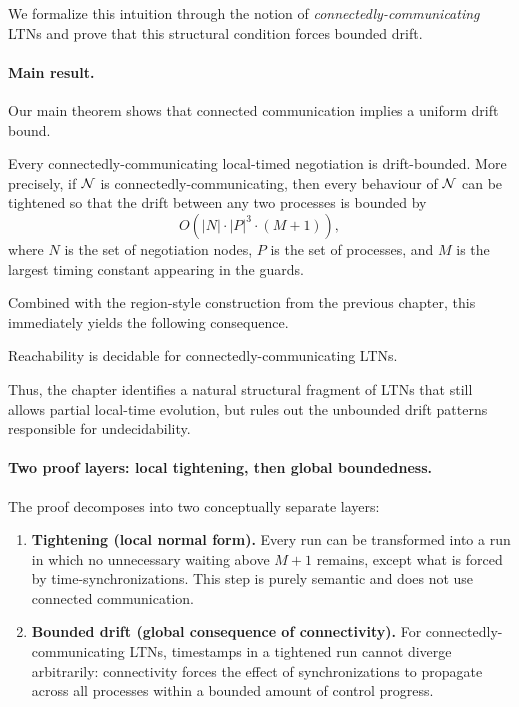 We formalize this intuition through the notion of \emph{connectedly-communicating} LTNs and prove that this structural condition forces bounded drift.

\paragraph*{Main result.}
Our main theorem shows that connected communication implies a uniform drift bound.

\begin{theorem}
Every connectedly-communicating local-timed negotiation is drift-bounded. More precisely, if $\mathcal{N}$ is connectedly-communicating, then every behaviour of $\mathcal{N}$ can be tightened so that the drift between any two processes is bounded by
\[
O(|N|\cdot |P|^3 \cdot (M+1)),
\]
where $N$ is the set of negotiation nodes, $P$ is the set of processes, and $M$ is the largest timing constant appearing in the guards.
\end{theorem}

Combined with the region-style construction from the previous chapter, this immediately yields the following consequence.

\begin{corollary}
Reachability is decidable for connectedly-communicating LTNs.
\end{corollary}

Thus, the chapter identifies a natural structural fragment of LTNs that still allows partial local-time evolution, but rules out the unbounded drift patterns responsible for undecidability.

\paragraph*{Two proof layers: local tightening, then global boundedness.}
The proof decomposes into two conceptually separate layers:
\begin{enumerate}
    \item \textbf{Tightening (local normal form).} Every run can be transformed into a run in which no unnecessary waiting above $M{+}1$ remains, except what is forced by time-synchronizations. This step is purely semantic and does not use connected communication.
    \item \textbf{Bounded drift (global consequence of connectivity).} For connectedly-communicating LTNs, timestamps in a tightened run cannot diverge arbitrarily: connectivity forces the effect of synchronizations to propagate across all processes within a bounded amount of control progress.
\end{enumerate}

